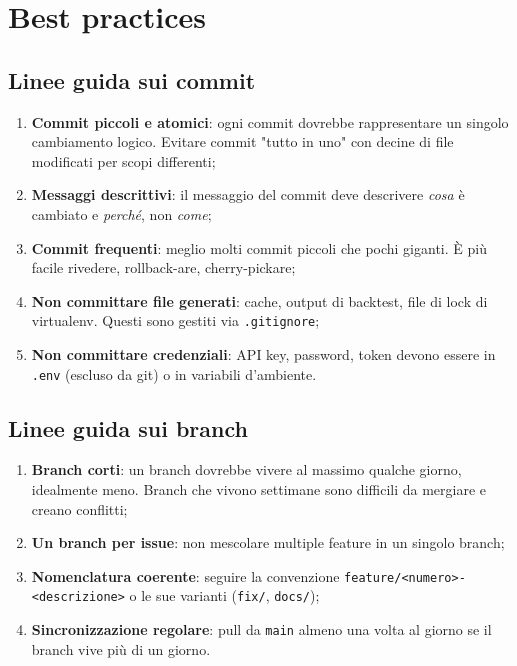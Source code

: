 \section{Best practices}

\subsection{Linee guida sui commit}

\begin{enumerate}
  \item \textbf{Commit piccoli e atomici}: ogni commit dovrebbe rappresentare un singolo cambiamento logico. Evitare commit "tutto in uno" con decine di file modificati per scopi differenti;
  \item \textbf{Messaggi descrittivi}: il messaggio del commit deve descrivere \emph{cosa} è cambiato e \emph{perché}, non \emph{come};
  \item \textbf{Commit frequenti}: meglio molti commit piccoli che pochi giganti. È più facile rivedere, rollback-are, cherry-pickare;
  \item \textbf{Non committare file generati}: cache, output di backtest, file di lock di virtualenv. Questi sono gestiti via \texttt{.gitignore};
  \item \textbf{Non committare credenziali}: API key, password, token devono essere in \texttt{.env} (escluso da git) o in variabili d'ambiente.
\end{enumerate}

\subsection{Linee guida sui branch}

\begin{enumerate}
  \item \textbf{Branch corti}: un branch dovrebbe vivere al massimo qualche giorno, idealmente meno. Branch che vivono settimane sono difficili da mergiare e creano conflitti;
  \item \textbf{Un branch per issue}: non mescolare multiple feature in un singolo branch;
  \item \textbf{Nomenclatura coerente}: seguire la convenzione \texttt{feature/<numero>-<descrizione>} o le sue varianti (\texttt{fix/}, \texttt{docs/});
  \item \textbf{Sincronizzazione regolare}: pull da \texttt{main} almeno una volta al giorno se il branch vive più di un giorno.
\end{enumerate}


